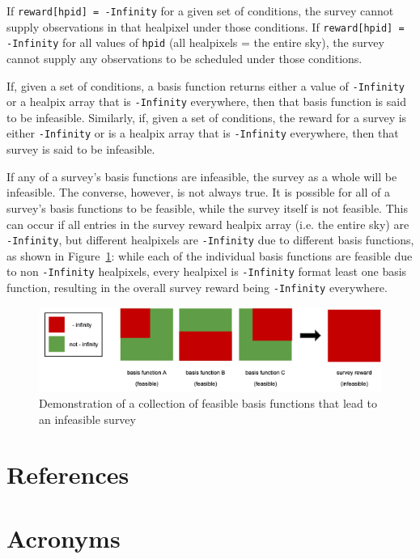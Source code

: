 \documentclass[OPS,lsstdraft,authoryear,toc]{lsstdoc}
\begin{document}
If \texttt{reward[hpid] = -Infinity} for a given set of conditions, the survey cannot supply observations in that healpixel under those conditions. If \texttt{reward[hpid] = -Infinity} for all values of \texttt{hpid} (all healpixels = the entire sky), the survey cannot supply any observations to be scheduled under those conditions.

If, given a set of conditions, a basis function returns either a value of \texttt{-Infinity} or a healpix array that is \texttt{-Infinity} everywhere, then that basis function is said to be infeasible. Similarly, if, given a set of conditions, the reward for a survey is either \texttt{-Infinity} or is a healpix array that is \texttt{-Infinity} everywhere, then that survey is said to be infeasible.

If any of a survey's basis functions are infeasible, the survey as a whole will be infeasible. The converse, however, is not always true. It is possible for all of a survey's basis functions to be feasible, while the survey itself is not feasible. This can occur if all entries in the survey reward healpix array (i.e. the entire sky) are \texttt{-Infinity}, but different healpixels are \texttt{-Infinity} due to different basis functions, as shown in Figure~\ref{fig:bfinfeas}: while each of the individual basis functions are feasible due to non \texttt{-Infinity} healpixels, every healpixel is \texttt{-Infinity} format least one basis function, resulting in the overall survey reward being \texttt{-Infinity} everywhere.


\begin{figure}
    \centering
    \includegraphics[width=0.5\linewidth]{bfsubsets.png}
    \caption{Demonstration of a collection of feasible basis functions that lead to an infeasible survey}
    \label{fig:bfinfeas}
\end{figure}



\appendix
\section{References} \label{sec:bib}
\renewcommand{\refname}{} %


\section{Acronyms} \label{sec:acronyms}

\end{document}
